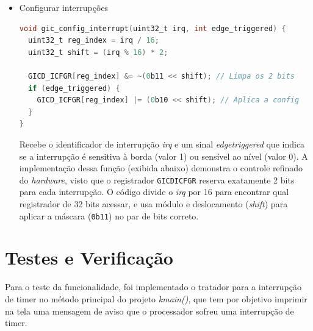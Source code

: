 \begin{itemize}
\begin{lstlisting}[language=C]
void gic_disable_interrupt(uint32_t irq) {
  if (irq >= MAX_INTERRUPTS)
    return;

  uint32_t reg_index = irq / 32;
  uint32_t bit_offset = irq % 32;

  // No ICENABLER escrever 1 desliga a interrupção
  GICD_ICENABLER[reg_index] = (1 << bit_offset);
}
\end{lstlisting}

Recebe o identificador de interrupção \emph{irq} e habilita o registrador GICD\textunderscore{}ICENABLER correspondente caso identificador não ultrapasse o valor MAX\textunderscore{}INTERRUPTS, desabilitando o tratamento de interrupção correspondente.
    \item Configurar interrupções


\begin{lstlisting}[language=C]
void gic_config_interrupt(uint32_t irq, int edge_triggered) {
  uint32_t reg_index = irq / 16;
  uint32_t shift = (irq % 16) * 2;

  GICD_ICFGR[reg_index] &= ~(0b11 << shift); // Limpa os 2 bits
  if (edge_triggered) {
    GICD_ICFGR[reg_index] |= (0b10 << shift); // Aplica a config
  }
}
\end{lstlisting}

Recebe o identificador de interrupção \emph{irq} e um sinal \emph{edge\textunderscore{}triggered} que indica se a interrupção é sensitiva à borda (valor 1) ou sensível ao nível (valor 0). A implementação dessa função (exibida abaixo) demonstra o controle refinado do \emph{hardware}, visto que o registrador \texttt{GICD\textunderscore{}ICFGR} reserva exatamente 2 bits para cada interrupção. O código divide o \emph{irq} por 16 para encontrar qual registrador de 32 bits acessar, e usa módulo e deslocamento (\emph{shift}) para aplicar a máscara (\texttt{0b11}) no par de bits correto.

\end{itemize}
\section{Testes e Verificação}
%
%
Para o teste da funcionalidade, foi implementado o tratador para a interrupção de timer no método principal do projeto \emph{kmain()}, que tem por objetivo imprimir na tela uma mensagem de aviso que o processador sofreu uma interrupção de timer.

